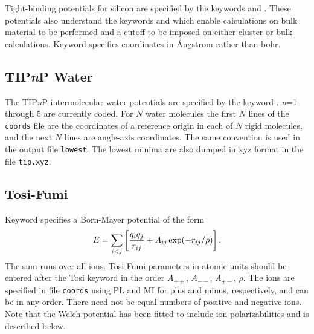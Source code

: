 {Tight-binding potentials for silicon are specified by the keywords {\/} 
and {\/}.
These potentials also understand the 
keywords {\/} and {\/} which enable calculations on bulk material
to be performed and a cutoff to be imposed on either cluster or bulk calculations.
Keyword {\/} specifies coordinates in \AA ngstrom rather than bohr.

\subsection{TIP{\it n\/}P Water}

The TIP{\it n\/}P intermolecular water potentials are specified by the keyword {\/}.
{\it n\/}=1 through 5 are currently coded. For $N$ water molecules the first $N$ lines of
the {\tt coords} file are the coordinates of a reference origin in each of $N$ rigid molecules,
and the next $N$ lines are angle-axis coordinates. The same convention is used in the output
file {\tt lowest}. The lowest minima are also dumped in xyz format in the file {\tt tip.xyz}.

\subsection{Tosi-Fumi}
 
Keyword {\/} specifies a Born-Mayer potential of the form
$$ E = \sum_{i<j}\left[ {q_i q_j\over r_{ij}} + A_{ij}\exp(-r_{ij}/\rho) \right]. $$
The sum runs over all ions. Tosi-Fumi\cite{tosif64} parameters in atomic units should be
entered after the Tosi keyword in the order $A_{++}$, $A_{--}$, $A_{+-}$, $\rho$.
The ions are specified in file {\tt coords} using PL and MI for plus and minus, respectively,
and can be in any order. There need not be equal numbers of positive and negative ions.
Note that the Welch potential has been fitted to include ion polarizabilities and is described below.

}

